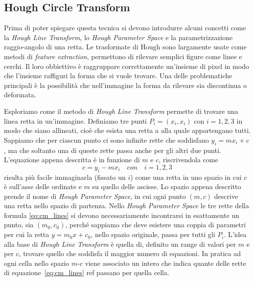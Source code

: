 
\clearpage
\subsection {Hough Circle Transform}
Prima di poter spiegare questa tecnica si devono introdurre alcuni concetti come la \textit{Hough Line Transform}, lo \textit{Hough Parameter Space} e la parametrizzazione raggio-angolo di una retta.
Le trasformate di Hough sono largamente usate come metodi di \textit{feature extraction}, permettono di rilevare semplici figure come linee e cerchi.
Il loro obbiettivo è raggruppare correttamente un'insieme di pixel in modo che l'insieme raffiguri la forma che si vuole trovare.
Una delle problematiche principali è la possibilità che nell'immagine la forma da rilevare sia discontinua o deformata.

Esploriamo come il metodo di \textit{Hough Line Transform} permette di trovare una linea retta in un'immagine.
Definiamo tre punti $P_i=(x_i, x_i)$ con $i=1,2,3$ in modo che siano allineati, cioè che esista una retta a alla quale appartengano tutti.
Sappiamo che per ciascun punto ci sono infinite rette che soddisfano $y_i = m x_i + c$, ma che soltanto una di queste rette passa anche per gli altri due punti.
L'equazione appena descritta è in funzione di $m$ e $c$, riscrivendola come
\begin{equation} \label{eq:cm_lines}
  c = y_i - m x_i \quad con \quad i=1,2,3
\end{equation}
risulta più facile immaginarla (fissato un $i$) come una retta in uno spazio in cui $c$ è sull'asse delle ordinate e $m$ su quello delle ascisse.
Lo spazio appena descritto prende il nome di \textit{Hough Parameter Space}, in cui ogni punto $(m,c)$ descrive una retta nello spazio di partenza.
Nello \textit{Hough Parameter Space} le tre rette della formula \ref{eq:cm_lines} si devono necessariamente incontrarsi in esattamente un punto, sia $(m_0,c_0)$, perché sappiamo che deve esistere una coppia di parametri per cui la retta $y = m_0 x + c_0$, nello spazio originale, passa per tutti gli $P_i$.
L'idea alla base di \textit{Hough Line Transform} è quella di, definito un range di valori per $m$ e per $c$, trovare quello che soddisfa il maggior numero di equazioni.
In pratica ad ogni cella nello spazio $m$-$c$ viene associato un intero che indica quante delle rette di equazione~\ref{eq:cm_lines} ref passano per quella cella.

